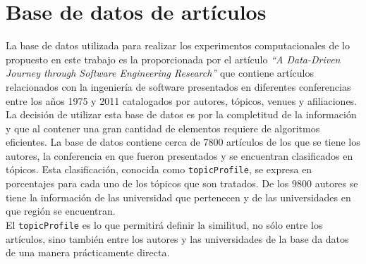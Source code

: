 \section{Base de datos de artículos}
La base de datos utilizada para realizar los experimentos computacionales de lo propuesto en este trabajo es la proporcionada por el artículo \textit{\textquotedblleft A Data-Driven Journey through Software Engineering Research\textquotedblright}\cite{dataDrive} que contiene artículos relacionados con la ingeniería de software presentados en diferentes conferencias entre los años 1975 y 2011 catalogados por autores, tópicos, venues y afiliaciones. La decisión de utilizar esta base de datos es por la completitud de la información y que al contener una gran cantidad de elementos requiere de algoritmos eficientes. La base de datos contiene cerca de $7800$ artículos de los que se tiene los autores, la conferencia en que fueron presentados y se encuentran clasificados en tópicos. Esta clasificación, conocida como \texttt{topicProfile}, se expresa en porcentajes para cada uno de los tópicos que son tratados. De los $9800$ autores se tiene la información de las universidad que pertenecen y de las universidades en que región se encuentran.\\
El \texttt{topicProfile} es lo que permitirá definir la similitud, no sólo entre los artículos, sino también entre los autores y las universidades de la base da datos de una manera prácticamente directa.\\

